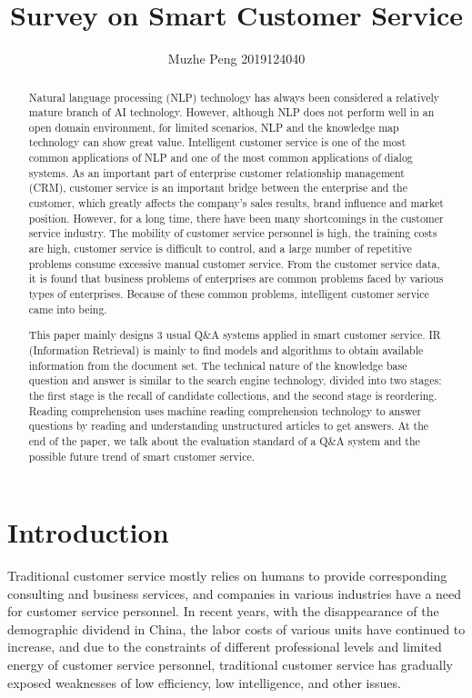 \documentclass[11pt,en,number]{elegantpaper}
\title{Survey on Smart Customer Service}
\author{Muzhe Peng   2019124040}
\institute{CCNU-UOW JI}
\date{}
\begin{document}
\maketitle
\begin{abstract}
	Natural language processing (NLP) technology has always been considered a relatively mature branch of AI technology. However, although NLP does not perform well in an open domain environment, for limited scenarios, NLP and the knowledge map technology can show great value. Intelligent customer service is one of the most common applications of NLP and one of the most common applications of dialog systems. As an important part of enterprise customer relationship management (CRM), customer service is an important bridge between the enterprise and the customer, which greatly affects the company's sales results, brand influence and market position\cite{1}. However, for a long time, there have been many shortcomings in the customer service industry. The mobility of customer service personnel is high, the training costs are high, customer service is difficult to control, and a large number of repetitive problems consume excessive manual customer service. From the customer service data, it is found that business problems of enterprises are common problems faced by various types of enterprises. Because of these common problems, intelligent customer service came into being. 

	This paper mainly designs 3 usual Q\&A systems applied in smart customer service\cite{2}. IR (Information Retrieval) is mainly to find models and algorithms to obtain available information from the document set. The technical nature of the knowledge base question and answer is similar to the search engine technology, divided into two stages: the first stage is the recall of candidate collections, and the second stage is reordering. Reading comprehension uses machine reading comprehension technology to answer questions by reading and understanding unstructured articles to get answers. At the end of the paper, we talk about the evaluation standard of a Q\&A system and the possible future trend of smart customer service.
\end{abstract}
	
	
\section{Introduction}
	Traditional customer service mostly relies on humans to provide corresponding consulting and business services, and companies in various industries have a need for customer service personnel. In recent years, with the disappearance of the demographic dividend in China, the labor costs of various units have continued to increase, and due to the constraints of different professional levels and limited energy of customer service personnel, traditional customer service has gradually exposed weaknesses of low efficiency, low intelligence, and other issues.
\end{document}
